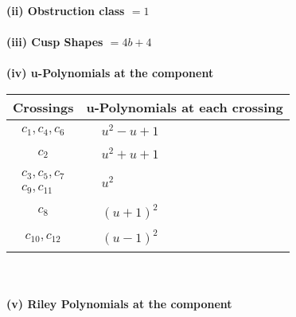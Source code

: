 \documentclass[1p]{elsarticle_modified}
\theoremstyle{definition}
\begin{document}
\flushleft \textbf{(ii) Obstruction class $= 1$}\\~\\
\flushleft \textbf{(iii) Cusp Shapes $= 4 b+4$}\\~\\
\newpage\renewcommand{\arraystretch}{1}
\flushleft \textbf{(iv) u-Polynomials at the component}\newline \\
\begin{tabular}{m{50pt}|m{274pt}}
Crossings & \hspace{64pt}u-Polynomials at each crossing \\
\hline $$\begin{aligned}c_{1},c_{4},c_{6}\end{aligned}$$&$\begin{aligned}
&u^2- u+1
\end{aligned}$\\
\hline $$\begin{aligned}c_{2}\end{aligned}$$&$\begin{aligned}
&u^2+u+1
\end{aligned}$\\
\hline $$\begin{aligned}c_{3},c_{5},c_{7}\\c_{9},c_{11}\end{aligned}$$&$\begin{aligned}
&u^2
\end{aligned}$\\
\hline $$\begin{aligned}c_{8}\end{aligned}$$&$\begin{aligned}
&(u+1)^2
\end{aligned}$\\
\hline $$\begin{aligned}c_{10},c_{12}\end{aligned}$$&$\begin{aligned}
&(u-1)^2
\end{aligned}$\\
\hline
\end{tabular}\\~\\
\newpage\renewcommand{\arraystretch}{1}
\flushleft \textbf{(v) Riley Polynomials at the component}\newline \\
\end{document}
